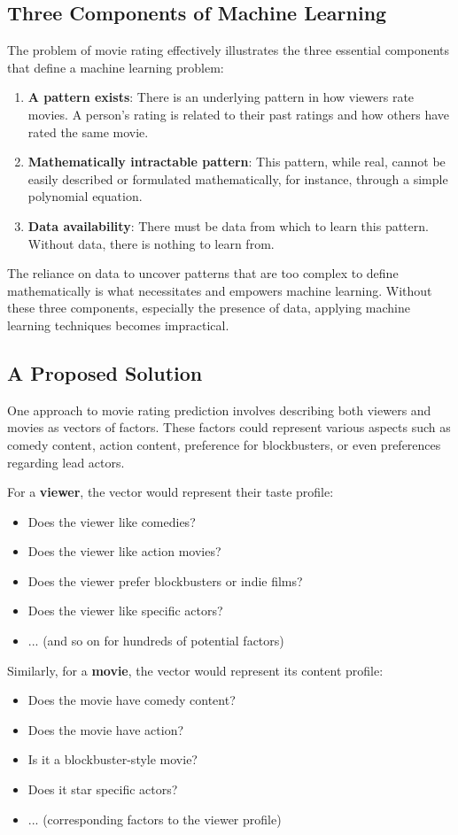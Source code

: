 \documentclass{article}
\begin{document}
\subsection{Three Components of Machine Learning}
The problem of movie rating effectively illustrates the three essential components that define a machine learning problem:
\begin{enumerate}
    \item \textbf{A pattern exists}: There is an underlying pattern in how viewers rate movies. A person's rating is related to their past ratings and how others have rated the same movie.
    \item \textbf{Mathematically intractable pattern}: This pattern, while real, cannot be easily described or formulated mathematically, for instance, through a simple polynomial equation.
    \item \textbf{Data availability}:  There must be data from which to learn this pattern.  Without data, there is nothing to learn from.
\end{enumerate}
The reliance on data to uncover patterns that are too complex to define mathematically is what necessitates and empowers machine learning.  Without these three components, especially the presence of data, applying machine learning techniques becomes impractical.

\subsection{A Proposed Solution}
One approach to movie rating prediction involves describing both viewers and movies as vectors of factors. These factors could represent various aspects such as comedy content, action content, preference for blockbusters, or even preferences regarding lead actors.

For a \textbf{viewer}, the vector would represent their taste profile:
\begin{itemize}
    \item Does the viewer like comedies?
    \item Does the viewer like action movies?
    \item Does the viewer prefer blockbusters or indie films?
    \item Does the viewer like specific actors?
    \item ... (and so on for hundreds of potential factors)
\end{itemize}

Similarly, for a \textbf{movie}, the vector would represent its content profile:
\begin{itemize}
    \item Does the movie have comedy content?
    \item Does the movie have action?
    \item Is it a blockbuster-style movie?
    \item Does it star specific actors?
    \item ... (corresponding factors to the viewer profile)
\end{itemize}
\end{document}
